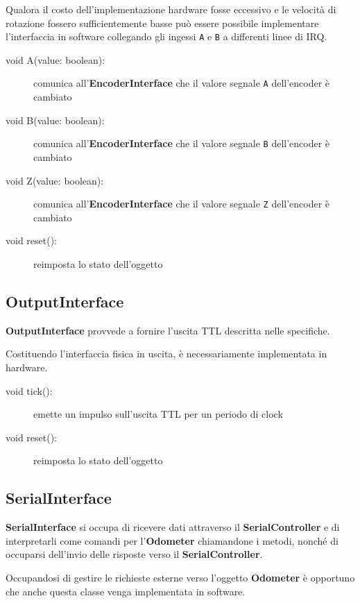 \documentclass [11pt,a4paper,oneside]{paper}
\newcommand{\component}[1]{\textbf{#1}}
\newcommand{\identifier}[1]{\texttt{#1}}
\begin{document}
Qualora il costo dell'implementazione hardware fosse eccessivo e
le velocità di rotazione fossero sufficientemente basse può essere
possibile implementare l'interfaccia in software collegando gli
ingessi \identifier{A} e \identifier{B} a differenti linee di IRQ.

\begin{description}
\item[void A(value: boolean):] comunica all'\component{EncoderInterface} che
    il valore segnale \identifier{A} dell'encoder è cambiato
\item[void B(value: boolean):] comunica all'\component{EncoderInterface} che
    il valore segnale \identifier{B} dell'encoder è cambiato
\item[void Z(value: boolean):] comunica all'\component{EncoderInterface} che
    il valore segnale \identifier{Z} dell'encoder è cambiato
\item[void reset():] reimposta lo stato dell'oggetto
\end{description}

\subsection{OutputInterface}
\component{OutputInterface} provvede a fornire l'uscita TTL descritta nelle
specifiche.

Costituendo l'interfaccia fisica in uscita, è necessariamente implementata in
hardware.

\begin{description}
\item[void tick():] emette un impulso sull'uscita TTL per un periodo di clock
\item[void reset():] reimposta lo stato dell'oggetto
\end{description}

\subsection{SerialInterface}
\component{SerialInterface} si occupa di ricevere dati attraverso il
\component{SerialController} e di interpretarli come comandi per
l'\component{Odometer} chiamandone i metodi, nonché di occuparsi
dell'invio delle risposte verso il \component{SerialController}.

Occupandosi di gestire le richieste esterne verso l'oggetto
\component{Odometer} è opportuno che anche questa classe venga
implementata in software.
\end{document}
